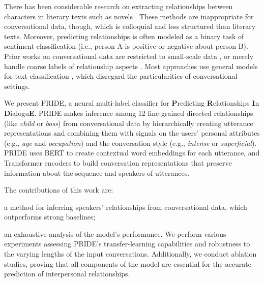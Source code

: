  There has been considerable research on extracting relationships between characters in literary texts such as novels \cite{chaturvedi2016modeling, chaturvedi2017unsupervised}. These methods are inappropriate for conversational data, though, 
which is colloquial and less structured than literary texts. 
Moreover, 
predicting relationships is often  modeled as a binary task of sentiment classification (i.e., person A is positive or negative about person B). 
Prior works on conversational data
are restricted to
small-scale data \cite{yu-etal-2020-dialogue}, or merely handle coarse labels of relationship aspects \cite{rashid2018characterizing,qamar2021relationship}. Most approaches use general models for text classification \cite{chen2020mpdd,jia2020ddrel}, which 
disregard the particularities of
conversational settings. 

 We present PRIDE, a 
neural multi-label classifier for \textbf{P}redicting \textbf{R}elationships \textbf{I}n \textbf{D}ialogu\textbf{E}. 
PRIDE makes inference among 12 fine-grained directed relationships (like \emph{child} or \emph{boss}) from conversational data by hierarchically creating utterance representations and combining them with signals on the users' personal attributes (e.g., \textit{age} and \textit{occupation}) and the conversation style (e.g., \textit{intense} or \textit{superficial}).
PRIDE uses BERT \cite{devlin2019bert} to create contextual word embeddings for each utterance, and Transformer encoders \cite{vaswani2017attention} to build conversation representations that preserve information about the sequence and speakers of utterances.

The contributions of this work are: 
\squishlist
\item a method for inferring speakers' relationships from conversational data, which outperforms strong baselines; 
\item an exhaustive analysis of the model's performance. We perform various experiments assessing PRIDE's transfer-learning capabilities and robustness to the varying lengths of the input conversations. Additionally, we conduct ablation studies, proving that all components of the model are essential for the accurate prediction of interpersonal relationships.
\squishend